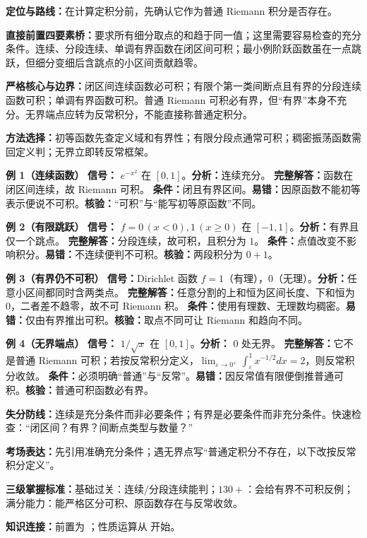 
\par

\begin{knowledgeBox}
\textbf{定位与路线：}在计算定积分前，先确认它作为普通 Riemann 积分是否存在。

\textbf{直接前置四要素桥：}要求所有细分取点的和趋于同一值；这里需要容易检查的充分条件。连续、分段连续、单调有界函数在闭区间可积；最小例阶跃函数虽在一点跳跃，但细分变细后含跳点的小区间贡献趋零。

\textbf{严格核心与边界：}闭区间连续函数必可积；有限个第一类间断点且有界的分段连续函数可积；单调有界函数可积。普通 Riemann 可积必有界，但“有界”本身不充分。无界端点应转为反常积分，不能直接称普通定积分。

\textbf{方法选择：}初等函数先查定义域和有界性；有限分段点通常可积；稠密振荡函数需回定义判；无界立即转反常框架。

\textbf{例 1（连续函数）}\quad
\textbf{信号：} \(e^{-x^2}\) 在 \([0,1]\)。\textbf{分析：}连续充分。
\textbf{完整解答：}函数在闭区间连续，故 Riemann 可积。
\textbf{条件：}闭且有界区间。\textbf{易错：}因原函数不能初等表示便说不可积。\textbf{核验：}“可积”与“能写初等原函数”不同。

\textbf{例 2（有限跳跃）}\quad
\textbf{信号：} \(f=0\,(x<0),1\,(x\ge0)\) 在 \([-1,1]\)。\textbf{分析：}有界且仅一个跳点。
\textbf{完整解答：}分段连续，故可积，且积分为 \(1\)。
\textbf{条件：}点值改变不影响积分。\textbf{易错：}不连续便判不可积。\textbf{核验：}两段积分为 \(0+1\)。

\textbf{例 3（有界仍不可积）}\quad
\textbf{信号：}Dirichlet 函数 \(f=1\)（有理），\(0\)（无理）。\textbf{分析：}任意小区间都同时含两类点。
\textbf{完整解答：}任意分割的上和恒为区间长度、下和恒为 \(0\)，二者差不趋零，故不可 Riemann 积。
\textbf{条件：}使用有理数、无理数均稠密。\textbf{易错：}仅由有界推出可积。\textbf{核验：}取点不同可让 Riemann 和趋向不同。

\textbf{例 4（无界端点）}\quad
\textbf{信号：} \(1/\sqrt x\) 在 \([0,1]\)。\textbf{分析：} \(0\) 处无界。
\textbf{完整解答：}它不是普通 Riemann 可积；若按反常积分定义，\(\lim_{\varepsilon\to0^+}\int_\varepsilon^1x^{-1/2}dx=2\)，则反常积分收敛。
\textbf{条件：}必须明确“普通”与“反常”。\textbf{易错：}因反常值有限便倒推普通可积。\textbf{核验：}普通可积函数必有界。

\textbf{失分防线：}连续是充分条件而非必要条件；有界是必要条件而非充分条件。快速检查：“闭区间？有界？间断点类型与数量？”

\textbf{考场表达：}先引用准确充分条件；遇无界点写“普通定积分不存在，以下改按反常积分定义”。

\textbf{三级掌握标准：}基础过关：连续/分段连续能判；\(130+\)：会给有界不可积反例；满分能力：能严格区分可积、原函数存在与反常收敛。

\textbf{知识连接：}前置为 ；性质运算从 开始。
\end{knowledgeBox}


